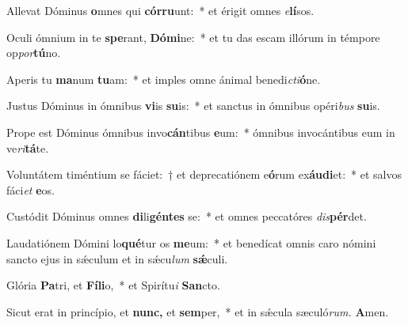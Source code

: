 \item Allevat Dóminus \textbf{o}mnes qui \textbf{cór}\textbf{ru}unt:~* et érigit omnes \textit{e}\textbf{lí}sos.
\item Oculi ó\-mnium in te \textbf{spe}rant, \textbf{Dó}\textbf{mi}ne:~* et tu das escam illórum in témpore op\textit{por}\textbf{tú}no.
\item Aperis tu \textbf{ma}num \textbf{tu}am:~* et imples omne ánimal benedi\tinyhspace\textit{cti}\textbf{ó}ne.
\item Justus Dóminus in ómnibus \textbf{vi}is \textbf{su}is:~* et san\-ctus in ómnibus opéri\textit{bus} \textbf{su}is.
\item Prope est Dóminus ómnibus invo\textbf{cán}tibus \textbf{e}um:~* ómnibus invocántibus eum in ve\tinyhspace\textit{ri}\textbf{tá}te.
\item Voluntátem timéntium se fáciet:~† et deprecatiónem e\textbf{ó}rum ex\textbf{áu}\textbf{di}et:~* et salvos fáci\tinyhspace\textit{et} \textbf{e}os.
\item Custódit Dóminus omnes \textbf{di}li\textbf{gén}\textbf{tes} se:~* et omnes peccatóres \textit{dis}\textbf{pér}det.
\item Laudatiónem Dómini lo\textbf{qué}tur os \textbf{me}um:~* et benedícat omnis caro nómini sancto ejus in sǽculum et in sǽcu\tinyhspace\textit{lum} \textbf{sǽ}culi.
\item Glória \textbf{Pa}tri, et \textbf{Fí}\textbf{li}o,~* et Spirítu\textit{i} \textbf{San}cto.
\item Sicut erat in princípio, et \textbf{nunc,} et \textbf{sem}per,~* et in sǽcula sæculó\textit{rum.} \textbf{A}men.